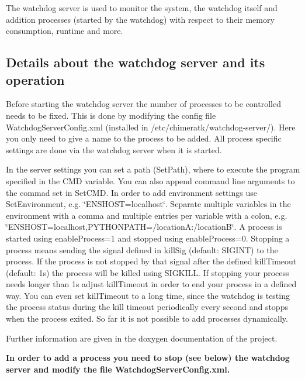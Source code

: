 The watchdog server is used to monitor the system, the watchdog itself and addition processes (started by the watchdog) with respect to their memory consumption, runtime and more.

\subsection*{Details about the watchdog server and its operation}

Before starting the watchdog server the number of processes to be controlled needs to be fixed. This is done by modifying the config file {\ttfamily Watchdog\+Server\+Config.\+xml} (installed in {\ttfamily /etc/chimeratk/watchdog-\/server/}). Here you only need to give a name to the process to be added. All process specific settings are done via the watchdog server when it is started.

In the server settings you can set a path ({\ttfamily Set\+Path}), where to execute the program specified in the C\+MD variable. You can also append command line arguments to the commad set in {\ttfamily Set\+C\+MD}. In order to add environment settings use {\ttfamily Set\+Environment}, e.\+g. {\ttfamily \char`\"{}\+E\+N\+S\+H\+O\+S\+T=localhost\char`\"{}}. Separate multiple variables in the environment with a comma and multiple entries per variable with a colon, e.\+g. {\ttfamily \char`\"{}\+E\+N\+S\+H\+O\+S\+T=localhost,\+P\+Y\+T\+H\+O\+N\+P\+A\+T\+H=/location\+A\+:/location\+B\char`\"{}}. A process is started using {\ttfamily enable\+Process=1} and stopped using {\ttfamily enable\+Process=0}. Stopping a process means sending the signal defined in {\ttfamily kill\+Sig} (default\+: {\ttfamily S\+I\+G\+I\+NT}) to the process. If the process is not stopped by that signal after the defined {\ttfamily kill\+Timeout} (default\+: 1s) the process will be killed using {\ttfamily S\+I\+G\+K\+I\+LL}. If stopping your process needs longer than 1s adjust {\ttfamily kill\+Timeout} in order to end your process in a defined way. You can even set {\ttfamily kill\+Timeout} to a long time, since the watchdog is testing the process status during the kill timeout periodically every second and stopps when the process exited. So far it is not possible to add processes dynamically.

Further information are given in the doxygen documentation of the project.

{\bfseries In order to add a process you need to stop (see below) the watchdog server and modify the file Watchdog\+Server\+Config.\+xml.}

